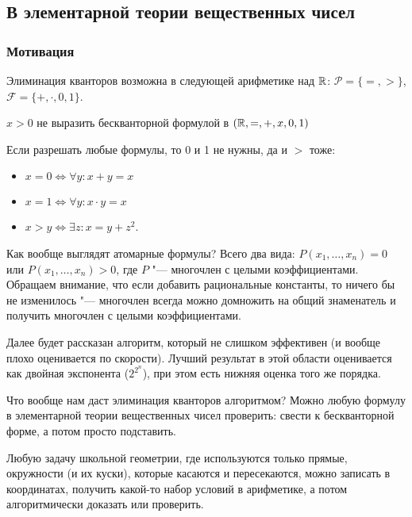 \subsection{В элементарной теории вещественных чисел}

\subsubsection{Мотивация}
	\begin{assertion}
		Элиминация кванторов возможна в следующей арифметике над $\mathbb{R}$:
		$\mathcal P = \{=, >\}$, $\mathcal F = \{+, \cdot, 0, 1\}$.
	\end{assertion}
	\begin{Rem}
		$x > 0$ не выразить бескванторной формулой в $(\mathbb{R}, =, +, x, 0, 1)$
	\end{Rem}
	\begin{Rem}
		Если разрешать любые формулы, то 0 и 1 не нужны, да и $>$ тоже:
		\begin{itemize}
		\item $x = 0 \iff \forall y \colon x + y = x$
		\item $x = 1 \iff \forall y \colon x \cdot y = x$
		\item $x > y \iff \exists z \colon x = y + z ^ 2$.
		\end{itemize}
	\end{Rem}

	Как вообще выглядят атомарные формулы?
	Всего два вида: $P(x_1, \dots, x_n)=0$ или $P(x_1, \dots, x_n) > 0$, где $P$ "--- многочлен с целыми коэффициентами.
	Обращаем внимание, что если добавить рациональные константы, то ничего бы не изменилось "--- многочлен всегда можно домножить на общий знаменатель
	и получить многочлен с целыми коэффициентами.

	Далее будет рассказан алгоритм, который не слишком эффективен (и вообще плохо оценивается по скорости).
	Лучший результат в этой области оценивается как двойная экспонента ($2^{2^n}$), при этом есть нижняя оценка того же порядка.

	Что вообще нам даст элиминация кванторов алгоритмом?
	Можно любую формулу в элементарной теории вещественных чисел проверить: свести к бескванторной форме, а потом просто подставить.

	\begin{exmp}
	Любую задачу школьной геометрии, где используются только прямые, окружности (и их куски),
	которые касаются и пересекаются, можно записать в координатах, получить какой-то набор условий
	в арифметике, а потом алгоритмически доказать или проверить.
	\end{exmp}

